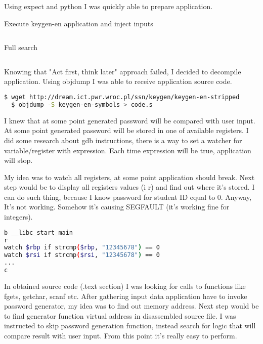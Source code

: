 \documentclass[a4paper, 11pt]{article}
\begin{document}
Using expect and python I was quickly able to prepare application.

\begin{listing}[!htb]
\caption{Execute keygen-en application and inject inputs}
\inputminted[mathescape, fontfamily=tt, frame=leftline,framerule=0.4pt,framesep=2mm]{bash}{single_test.exp}
\end{listing}

\begin{listing}[!htb]
\caption{Full search}
\inputminted[mathescape, fontfamily=tt, frame=leftline,framerule=0.4pt,framesep=2mm]{python}{force.py}
\end{listing}

Knowing that "Act first, think later" approach failed,  I decided to decompile application.
Using objdump I was able to receive application source code.

\begin{lstlisting}[language=bash]
  $ wget http://dream.ict.pwr.wroc.pl/ssn/keygen/keygen-en-stripped
  $ objdump -S keygen-en-symbols > code.s
\end{lstlisting}

I knew that at some point generated password will be compared with user input. At some point generated password will be stored in one of available registers.
I did some research about gdb instructions, there is a way to set a watcher for variable/register with expression. Each time expression will be true, application will stop.

My idea was to watch all registers, at some point application should break. Next step would be to display all registers values (i r) and find out where it's stored.
I can do such thing, because I know password for student ID equal to 0. Anyway, It's not working. Somehow it's causing SEGFAULT (it's working fine for integers).

\begin{lstlisting}[language=bash]
b __libc_start_main
r
watch $rbp if strcmp($rbp, "12345678") == 0
watch $rsi if strcmp($rsi, "12345678") == 0
...
c
\end{lstlisting}


In obtained source code (.text section) I was looking for calls to functions like fgets, getchar, scanf etc.
After gathering input data application have to invoke password generator, my idea was to find out memory address.
Next step would be to find generator function virtual address in disassembled source file.
I was instructed to skip password generation function, instead search for logic that will compare result with user input.
From this point it's really easy to perform. 
\end{document}
